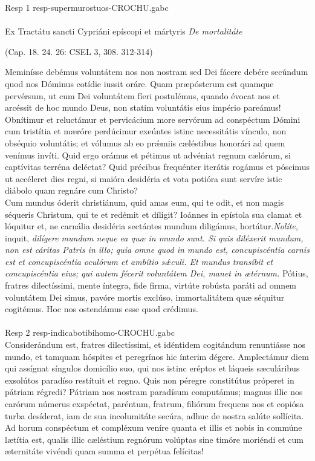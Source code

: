 \documentclass[options]{article}
\begin{document}
	Resp 1 resp-supermurostuos-CROCHU.gabc\\
	\\
	Ex Tractátu sancti Cypriáni epíscopi et mártyris \emph{De mortalitáte}
	\begin{flushright}
		(Cap. 18. 24. 26: CSEL 3, 308. 312-314)
	\end{flushright}
Meminísse debémus voluntátem nos non nostram sed Dei fácere debére secúndum quod nos Dóminus cotídie iussit oráre.
Quam præpósterum est quamque pervérsum, ut cum Dei voluntátem fíeri postulémus, quando évocat nos et arcéssit de hoc mundo Deus, non statim voluntátis eius império pareámus!
Obnítimur et reluctámur et pervicácium more servórum ad conspéctum Dómini cum tristítia et mæróre perdúcimur exeúntes istinc necessitátis vínculo, non obséquio voluntátis; et vólumus ab eo pr\'{æ}miis cæléstibus honorári ad quem venímus invíti.
Quid ergo orámus et pétimus ut advéniat regnum cælórum, si captívitas terréna deléctat? Quid précibus frequénter iterátis rogámus et póscimus ut accéleret dies regni, si maióra desidéria et vota potióra sunt servíre istic diábolo quam regnáre cum Christo?\\ 
Cum mundus óderit christiánum, quid amas eum, qui te odit, et non magis séqueris Christum, qui te et redémit et díligit? Ioánnes in epístola sua clamat et lóquitur et, ne carnália desidéria sectántes mundum diligámus, hortátur.\emph{Nolíte,} inquit, \emph{dilígere mundum neque ea quæ in mundo sunt. Si quis diléxerit mundum, non est cáritas Patris in illo; quia omne quod in mundo est, concupiscéntia carnis est et concupiscéntia oculórum et ambítio s\'{æ}culi. Et mundus transíbit et concupiscéntia eius; qui autem fécerit voluntátem Dei, manet in ætérnum.}
Pótius, fratres dilectíssimi, mente íntegra, fide firma, virtúte robústa paráti ad omnem voluntátem Dei simus, pavóre mortis exclúso, immortalitátem quæ séquitur cogitémus. Hoc nos ostendámus esse quod crédimus. \\
 \\
  Resp 2  resp-indicabotibihomo-CROCHU.gabc
  \\
    Considerándum est, fratres dilectíssimi, et idéntidem cogitándum renuntiásse nos mundo, et tamquam hóspites et peregrínos hic ínterim dégere. Amplectámur diem qui assígnat síngulos domicílio suo, qui nos istinc eréptos et láqueis sæculáribus exsolútos paradíso restítuit et regno. Quis non péregre constitútus próperet in pátriam régredi? Pátriam nos nostram paradísum computámus; magnus illic nos carórum númerus exspéctat, paréntum, fratrum, filiórum frequens nos et copiósa turba desíderat, iam de sua incolumitáte secúra, adhuc de nostra salúte sollícita. Ad horum conspéctum et compléxum veníre quanta et illis et nobis in commúne lætítia est, qualis illic cæléstium regnórum volúptas sine timóre moriéndi et cum æternitáte vivéndi quam summa et perpétua felícitas! \\
\end{document}
